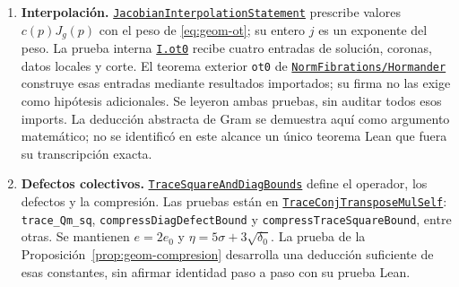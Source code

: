 \begin{enumerate}
\item \textbf{Interpolación.}
\href{https://github.com/CocoSgt/riemann-hypothesis-lean/blob/7cbf7a0c32fca1badf05931879a37c3f8a2b03b4/src/ReciprocityTheory/L2DbarEstimates/JacobianInterpolationStatement.lean}{\texttt{JacobianInterpolationStatement}}
prescribe valores $c(p)J_g(p)$ con el peso de
\eqref{eq:geom-ot}; su entero $j$ es un exponente del peso.
La prueba interna
\href{https://github.com/CocoSgt/riemann-hypothesis-lean/blob/7cbf7a0c32fca1badf05931879a37c3f8a2b03b4/src/ReciprocityTheory/L2DbarEstimates/LeviForms/Ot0.lean}{\texttt{I.ot0}}
recibe cuatro entradas de solución, coronas, datos locales y corte.
El teorema exterior \texttt{ot0} de
\href{https://github.com/CocoSgt/riemann-hypothesis-lean/blob/7cbf7a0c32fca1badf05931879a37c3f8a2b03b4/src/ReciprocityTheory/L2DbarEstimates/NormFibrations/Hormander.lean}{\texttt{NormFibrations/Hormander}}
construye esas entradas mediante resultados importados;
su firma no las exige como hipótesis adicionales.
Se leyeron ambas pruebas, sin auditar todos esos imports.
La deducción abstracta de Gram se demuestra aquí como
argumento matemático; no se identificó en este alcance
un único teorema Lean que fuera su transcripción exacta.

\item \textbf{Defectos colectivos.}
\href{https://github.com/CocoSgt/riemann-hypothesis-lean/blob/7cbf7a0c32fca1badf05931879a37c3f8a2b03b4/src/Formalism/SizeWindowBrackets/TraceSquareAndDiagBounds.lean}{\texttt{TraceSquareAndDiagBounds}}
define el operador, los defectos y la compresión.
Las pruebas están en
\href{https://github.com/CocoSgt/riemann-hypothesis-lean/blob/7cbf7a0c32fca1badf05931879a37c3f8a2b03b4/src/Formalism/SizeWindowBrackets/ChainSlopeWindows/TraceConjTransposeMulSelf.lean}{\texttt{TraceConjTransposeMulSelf}}:
\texttt{trace\_Qm\_sq}, \texttt{compressDiagDefectBound}
y \texttt{compressTraceSquareBound}, entre otras.
Se mantienen $e=2e_0$ y $\eta=5\sigma+3\sqrt{\delta_0}$.
La prueba de la Proposición~\ref{prop:geom-compresion}
desarrolla una deducción suficiente de esas constantes,
sin afirmar identidad paso a paso con su prueba Lean.


\end{enumerate}
